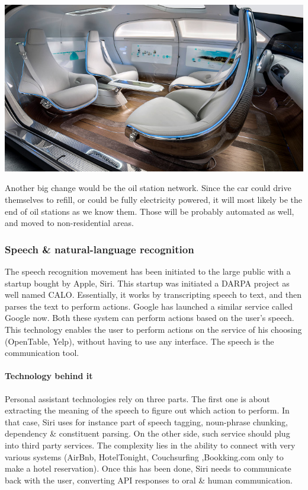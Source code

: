 \documentclass[12pt]{article}
\begin{document}
\smallskip
\includegraphics[width=\textwidth]{mercedes}
\smallskip

Another big change would be the oil station network. Since the car could drive
themselves to refill, or could be fully electricity powered, it will most likely
be the end of oil stations as we know them. Those will be probably automated as
well, and moved to non-residential areas.


\subsubsection{Speech \& natural-language recognition}

The speech recognition movement has been initiated to the large public with a
startup bought by Apple, Siri. This startup was initiated a DARPA project as
well named CALO. Essentially, it works by transcripting speech to text, and then
parses the text to perform actions. Google has launched a similar service called
Google now. Both these system can perform actions based on the user's speech.
This technology enables the user to perform actions on the service of his
choosing (OpenTable, Yelp), without having to use any interface. The speech is
the communication tool.
\\

\paragraph{Technology behind it}
Personal assistant technologies rely on three parts.
The first one is about extracting the meaning of the speech to figure out which
action to perform. In that case, Siri uses for instance part of speech tagging,
noun-phrase chunking, dependency \& constituent parsing. On the other side,
such service should plug into third party services. The complexity lies in the
ability to connect with very various systems (AirBnb, HotelTonight, Couchsurfing
,Bookking.com only to make a hotel reservation). Once this has been done, Siri
needs to communicate back with the user, converting API responses to oral \&
human communication.
\end{document}
